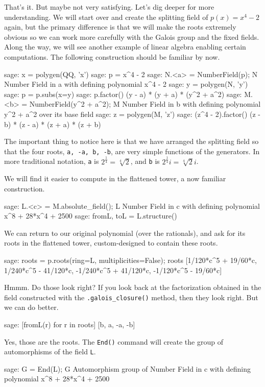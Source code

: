%
That's it.  But maybe not very satisfying.  Let's dig deeper for more understanding.  We will start over and create the splitting field of $p(x)=x^4-2$ again, but the primary difference is that we will make the roots extremely obvious so we can work more carefully with the Galois group and the fixed fields.  Along the way, we will see another example of linear algebra enabling certain computations.  The following construction should be familiar by now.
%
\begin{sageexample}
sage: x = polygen(QQ, 'x')
sage: p = x^4 - 2
sage: N.<a> = NumberField(p); N
Number Field in a with defining polynomial x^4 - 2
sage: y = polygen(N, 'y')
sage: p = p.subs(x=y)
sage: p.factor()
(y - a) * (y + a) * (y^2 + a^2)
sage: M.<b> = NumberField(y^2 + a^2); M
Number Field in b with defining polynomial y^2 + a^2 over
its base field
sage: z = polygen(M, 'z')
sage: (z^4 - 2).factor()
(z - b) * (z - a) * (z + a) * (z + b)
\end{sageexample}
%
The important thing to notice here is that we have arranged the splitting field so that the four roots, \verb?a, -a, b, -b?, are very simple functions of the generators.  In more traditional notation, \verb?a? is $2^{\frac{1}{4}}=\sqrt[4]{2}$, and \verb?b? is $2^{\frac{1}{4}}i=\sqrt[4]{2}i$.\par
%
We will find it easier to compute in the flattened tower, a now familiar construction.
%
\begin{sageexample}
sage: L.<c> = M.absolute_field(); L
Number Field in c with defining polynomial x^8 + 28*x^4 + 2500
sage: fromL, toL = L.structure()
\end{sageexample}
%
We can return to our original polynomial (over the rationals), and ask for its roots in the flattened tower, custom-designed to contain these roots.
%
\begin{sageexample}
sage: roots = p.roots(ring=L, multiplicities=False); roots
[1/120*c^5 +  19/60*c,
 1/240*c^5 - 41/120*c,
-1/240*c^5 + 41/120*c,
-1/120*c^5 -  19/60*c]
\end{sageexample}
%
Hmmm.  Do those look right?  If you look back at the factorization obtained in the field constructed with the \verb?.galois_closure()? method, then they look right.  But we can do better.
%
\begin{sageexample}
sage: [fromL(r) for r in roots]
[b, a, -a, -b]
\end{sageexample}
%
Yes, those are the roots.
%
The \verb?End()? command will create the group of automorphisms of the field \verb?L?.
%
\begin{sageexample}
sage: G = End(L); G
Automorphism group of Number Field in c with
defining polynomial x^8 + 28*x^4 + 2500
\end{sageexample}
